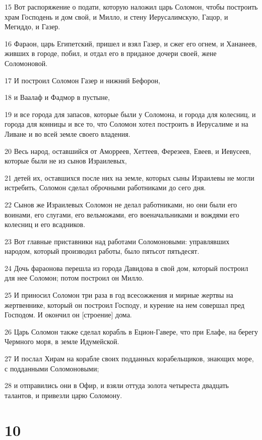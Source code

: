 \par 15 Вот распоряжение о подати, которую наложил царь Соломон, чтобы построить храм Господень и дом свой, и Милло, и стену Иерусалимскую, Гацор, и Мегиддо, и Газер.
\par 16 Фараон, царь Египетский, пришел и взял Газер, и сжег его огнем, и Хананеев, живших в городе, побил, и отдал его в приданое дочери своей, жене Соломоновой.
\par 17 И построил Соломон Газер и нижний Бефорон,
\par 18 и Ваалаф и Фадмор в пустыне,
\par 19 и все города для запасов, которые были у Соломона, и города для колесниц, и города для конницы и все то, что Соломон хотел построить в Иерусалиме и на Ливане и во всей земле своего владения.
\par 20 Весь народ, оставшийся от Аморреев, Хеттеев, Ферезеев, Евеев, и Иевусеев, которые были не из сынов Израилевых,
\par 21 детей их, оставшихся после них на земле, которых сыны Израилевы не могли истребить, Соломон сделал оброчными работниками до сего дня.
\par 22 Сынов же Израилевых Соломон не делал работниками, но они были его воинами, его слугами, его вельможами, его военачальниками и вождями его колесниц и его всадников.
\par 23 Вот главные приставники над работами Соломоновыми: управлявших народом, который производил работы, было пятьсот пятьдесят.
\par 24 Дочь фараонова перешла из города Давидова в свой дом, который построил для нее Соломон; потом построил он Милло.
\par 25 И приносил Соломон три раза в год всесожжения и мирные жертвы на жертвеннике, который он построил Господу, и курение на нем совершал пред Господом. И окончил он [строение] дома.
\par 26 Царь Соломон также сделал корабль в Ецион-Гавере, что при Елафе, на берегу Чермного моря, в земле Идумейской.
\par 27 И послал Хирам на корабле своих подданных корабельщиков, знающих море, с подданными Соломоновыми;
\par 28 и отправились они в Офир, и взяли оттуда золота четыреста двадцать талантов, и привезли царю Соломону.

\chapter{10}

